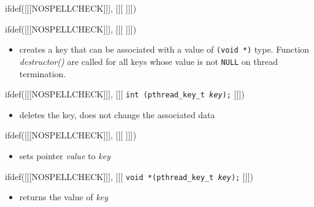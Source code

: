 
ifdef([[[NOSPELLCHECK]]], [[[
]]])

\begin{slide}
ifdef([[[NOSPELLCHECK]]], [[[
]]])
\begin{itemize}
\item creates a key that can be associated with a value of
\texttt{(void *)} type.  Function \emph{destructor()} are called for all keys
whose value is not \texttt{NULL} on thread termination.
\end{itemize}
ifdef([[[NOSPELLCHECK]]], [[[
\texttt{int (pthread\_key\_t \emph{key});}
]]])
\begin{itemize}
\item deletes the key, does not change the associated data
\end{itemize}
ifdef([[[NOSPELLCHECK]]], [[[
]]])
\begin{itemize}
\item sets pointer \emph{value} to \emph{key}
\end{itemize}
ifdef([[[NOSPELLCHECK]]], [[[
\texttt{void *(pthread\_key\_t \emph{key});}
]]])
\begin{itemize}
\item returns the value of \emph{key}
\end{itemize}
\end{slide}

